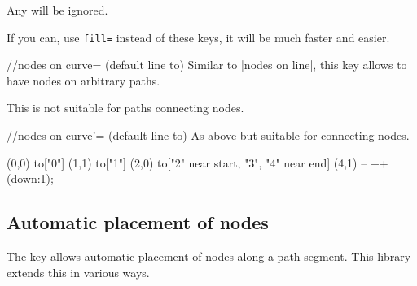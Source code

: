 \begin{multicols}{2}
Any  will be ignored.

If you can, use \texttt{fill=}
instead of these keys, it will be much faster and easier.

\begin{stylekey}{/\tikzext/nodes on curve= (default line to)}
Similar to |nodes on line|, this key allows
to have nodes on arbitrary paths.

This is not suitable for paths connecting nodes.
\end{stylekey}

\begin{stylekey}{/\tikzext/nodes on curve'= (default line to)}
As above but suitable for connecting nodes.
\end{stylekey}

\begin{codeexample}[preamble=\usetikzlibrary{ext.nodes, intersections, quotes, spath3}]
\end{codeexample}
\begin{codeexample}[preamble=\usetikzlibrary{ext.nodes, intersections, quotes, spath3}]
\tikz[inner sep=.15em, circle, nodes={draw, green}, sloped, ultra thick]
  \draw[->, ext/nodes on curve=bend left] (0,0) to["0"] (1,1)
                                                to["1"] (2,0)
                  to["2" near start, "3", "4" near end] (4,1)
                                                -- ++(down:1);
\end{codeexample}

\newcolumn
\subsection{Automatic placement of nodes}
The  key allows automatic placement of
nodes along a path segment.
This library extends this in various ways.


\end{multicols}
